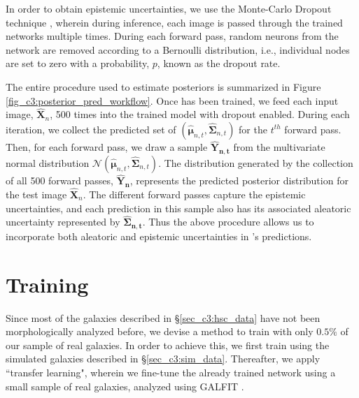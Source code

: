 In order to obtain epistemic uncertainties, we use the Monte-Carlo Dropout technique \citep{Srivastava2014Dropout:Overfitting}, wherein during inference, each image is passed through the trained networks multiple times. During each forward pass, random neurons from the network are removed according to a Bernoulli distribution, i.e., individual nodes are set to zero with a probability, $p$, known as the dropout rate.

The entire procedure used to estimate posteriors is summarized in Figure \ref{fig_c3:posterior_pred_workflow}. Once \gampen{} has been trained, we feed each input image, $\boldsymbol{\hat{X}}_n$, 500 times into the trained model with dropout enabled. During each iteration, we collect the predicted set of $\left(\hat{\boldsymbol{\mu}}_{n,t},\boldsymbol{\hat{\Sigma}}_{n,t}\right)$ for the $t^{th}$ forward pass. Then, for each forward pass, we draw a sample $\boldsymbol{\hat{Y}_{n,t}}$ from the multivariate normal distribution $\mathcal{N}\left(\boldsymbol{\hat{\mu}}_{n,t},\boldsymbol{\hat{\Sigma}}_{n,t}\right)$. The distribution generated by the collection of all 500 forward passes, $\boldsymbol{\hat{Y}_{n}}$,
represents the predicted posterior distribution for the test image $\boldsymbol{\hat{X}}_n$. The different forward passes capture the epistemic uncertainties, and each prediction in this sample also has its associated aleatoric uncertainty represented by $\boldsymbol{\hat{\Sigma}_{n,t}}$. Thus the above procedure allows us to incorporate both aleatoric and epistemic uncertainties in \gampen{}'s predictions.


\section{Training \gampen{}} \label{sec_c3:method}
 
Since most of the galaxies described in \S \ref{sec_c3:hsc_data} have not been morphologically analyzed before, we devise a method to train \gampen{} with only $0.5\%$ of our sample of real galaxies. In order to achieve this, we first train \gampen{} using the simulated galaxies described in \S \ref{sec_c3:sim_data}. Thereafter, we apply ``transfer learning", wherein we fine-tune the already trained network using a small sample of real galaxies, analyzed using GALFIT \citep{galfit}. 

